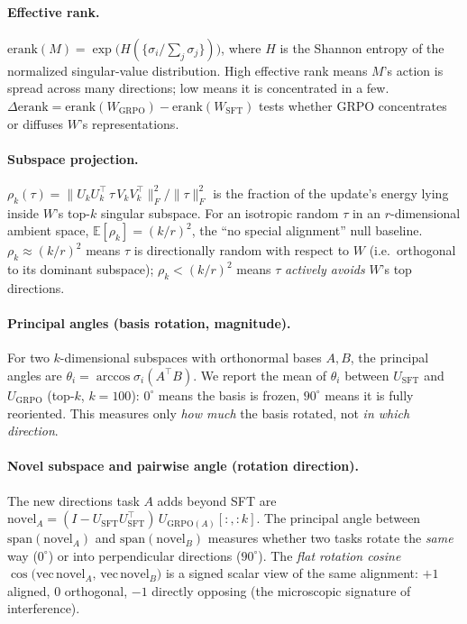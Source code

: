 \documentclass{article}
\newcommand{\tv}{\tau}
\newcommand{\Wsft}{W_{\mathrm{SFT}}}
\newcommand{\Wg}{W_{\mathrm{GRPO}}}
\newcommand{\dg}{^{\circ}}
\begin{document}
\paragraph{Effective rank.} $\mathrm{erank}(M)=\exp\!\big(H(\{\sigma_i/\!\sum_j\sigma_j\})\big)$,
where $H$ is the Shannon entropy of the normalized singular-value distribution. High effective rank
means $M$'s action is spread across many directions; low means it is concentrated in a few.
$\Delta\mathrm{erank}=\mathrm{erank}(\Wg)-\mathrm{erank}(\Wsft)$ tests whether GRPO concentrates or
diffuses $W$'s representations.

\paragraph{Subspace projection.} $\rho_k(\tv)=\|U_kU_k^\top\,\tv\,V_kV_k^\top\|_F^2/\|\tv\|_F^2$ is
the fraction of the update's energy lying inside $W$'s top-$k$ singular subspace. For an isotropic
random $\tv$ in an $r$-dimensional ambient space, $\mathbb{E}[\rho_k]=(k/r)^2$, the ``no special
alignment'' null baseline. $\rho_k\approx(k/r)^2$ means $\tv$ is directionally random with respect
to $W$ (i.e.\ orthogonal to its dominant subspace); $\rho_k<(k/r)^2$ means $\tv$ \emph{actively
avoids} $W$'s top directions.

\paragraph{Principal angles (basis rotation, magnitude).} For two $k$-dimensional subspaces with
orthonormal bases $A,B$, the principal angles are $\theta_i=\arccos\sigma_i(A^\top B)$. We report the
mean of $\theta_i$ between $U_{\mathrm{SFT}}$ and $U_{\mathrm{GRPO}}$ (top-$k$, $k{=}100$): $0\dg$
means the basis is frozen, $90\dg$ means it is fully reoriented. This measures only \emph{how much}
the basis rotated, not \emph{in which direction}.

\paragraph{Novel subspace and pairwise angle (rotation direction).} The new directions task $A$ adds
beyond SFT are $\mathrm{novel}_A=(I-U_{\mathrm{SFT}}U_{\mathrm{SFT}}^\top)\,U_{\mathrm{GRPO}(A)}[:,{:}k]$.
The principal angle between $\mathrm{span}(\mathrm{novel}_A)$ and $\mathrm{span}(\mathrm{novel}_B)$
measures whether two tasks rotate the \emph{same} way ($0\dg$) or into perpendicular directions
($90\dg$). The \emph{flat rotation cosine} $\cos\!\big(\mathrm{vec}\,\mathrm{novel}_A,\,
\mathrm{vec}\,\mathrm{novel}_B\big)$ is a signed scalar view of the same alignment: $+1$ aligned,
$0$ orthogonal, $-1$ directly opposing (the microscopic signature of interference).
\end{document}
